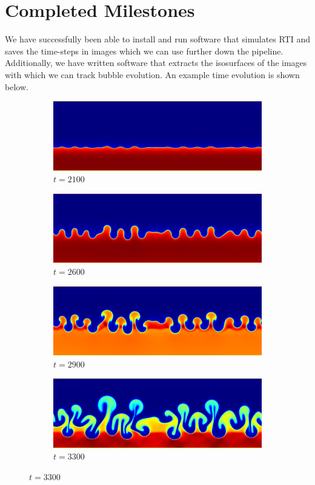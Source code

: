 \documentclass[12pt, fullpage,letterpaper]{article}
\begin{document}
	\section*{\normalfont Completed Milestones} We have successfully been able to install and run software that simulates RTI and saves the time-steps in images which we can use further down the pipeline. Additionally, we have written software that extracts the isosurfaces of the images with which we can track bubble evolution. An example time evolution is shown below.
		\begin{figure}[ht!]
		\centering
		\begin{subfigure}
			\centering
			\includegraphics[scale = .25]{fig1.png}
			\caption{$t = 2100$}
		\end{subfigure}
		\begin{subfigure}
			\centering
			\includegraphics[scale = .25]{fig2.png}
			\caption{$t = 2600$}
		\end{subfigure}
		\begin{subfigure}
			\centering
			\includegraphics[scale = .25]{fig3.png}
			\caption{$t = 2900$}
		\end{subfigure}
		\begin{subfigure}
			\centering
			\includegraphics[scale = .25]{fig4.png}
			\caption{$t = 3300$}
		\end{subfigure}
	\end{figure}
	
\end{document}
